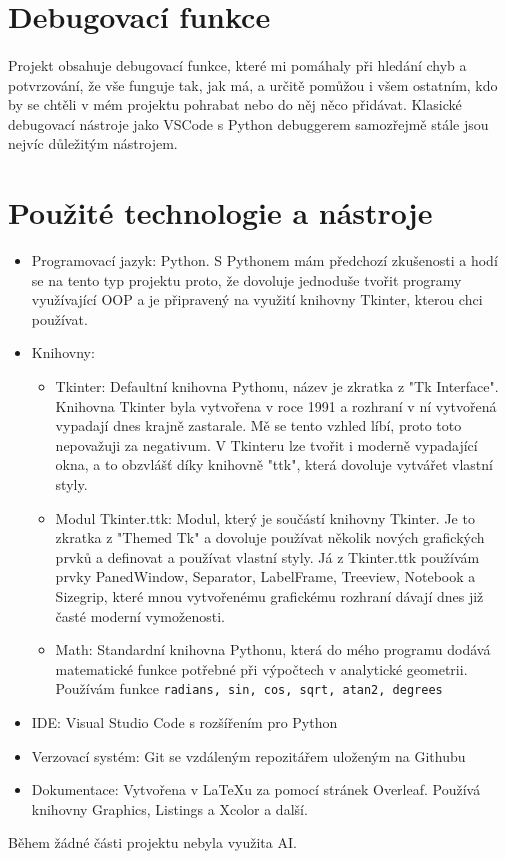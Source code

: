 \documentclass[12pt,a4paper]{report}
\begin{document}
\section{Debugovací funkce}
\paragraph{} Projekt obsahuje debugovací funkce, které mi pomáhaly při hledání chyb a potvrzování, že vše funguje tak, jak má, a určitě pomůžou i všem ostatním, kdo by se chtěli v mém projektu pohrabat nebo do něj něco přidávat. Klasické debugovací nástroje jako VSCode s Python debuggerem samozřejmě stále jsou nejvíc důležitým nástrojem.
\section{Použité technologie a nástroje}
\begin{itemize}
    \item Programovací jazyk: Python. S Pythonem mám předchozí zkušenosti a hodí se na tento typ projektu proto, že dovoluje jednoduše tvořit programy využívající OOP a je připravený na využití knihovny Tkinter, kterou chci používat.
\item Knihovny: \begin{itemize}
    \item Tkinter: Defaultní knihovna Pythonu, název je zkratka z "Tk Interface".
Knihovna Tkinter byla vytvořena v roce 1991 a rozhraní v ní vytvořená vypadají dnes krajně zastarale. Mě se tento vzhled líbí, proto toto nepovažuji za negativum. V Tkinteru lze tvořit i moderně vypadající okna, a to obzvlášť díky knihovně "ttk", která dovoluje vytvářet vlastní styly.
\item Modul Tkinter.ttk: Modul, který je součástí knihovny Tkinter. Je to zkratka z "Themed Tk" a dovoluje používat několik nových grafických prvků a definovat a používat vlastní styly. Já z Tkinter.ttk používám prvky PanedWindow, Separator, LabelFrame, Treeview, Notebook a Sizegrip, které mnou vytvořenému grafickému rozhraní dávají dnes již časté moderní vymoženosti.
\item Math: Standardní knihovna Pythonu, která do mého programu dodává matematické funkce potřebné při výpočtech v analytické geometrii. Používám funkce \lstinline{radians, sin, cos, sqrt, atan2, degrees}
\end{itemize}
\item IDE: Visual Studio Code s rozšířením pro Python
\item Verzovací systém: Git se vzdáleným repozitářem uloženým na Githubu
\item Dokumentace: Vytvořena v LaTeXu za pomocí stránek Overleaf. Používá knihovny Graphics, Listings a Xcolor a další.
\end{itemize} Během žádné části projektu nebyla využita AI.
\end{document}
